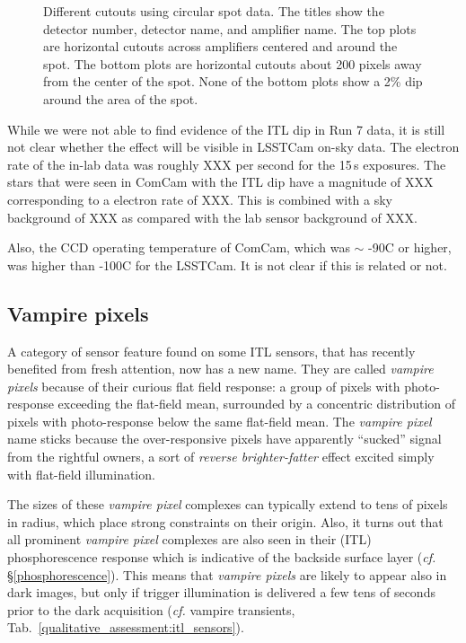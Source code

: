 \begin{figure}[ht]
\caption{Different cutouts using circular spot data. The titles show the detector number, detector name, and amplifier name. The top plots are horizontal cutouts across amplifiers centered and around the spot. The bottom plots are horizontal cutouts about 200 pixels away from the center of the spot. None of the bottom plots show a 2\% dip around the area of the spot.}
\label{fig:ITLDip_Spots}
\end{figure}

While we were not able to find evidence of the ITL dip in Run 7 data, it
is still not clear whether the effect will be visible in LSSTCam on-sky data.
The electron rate of the in-lab data was roughly XXX per second for the 15\,s exposures. The stars that were seen in ComCam with the ITL dip
have a magnitude of XXX corresponding to a electron rate of XXX. This is
combined with a sky background of XXX as compared with the lab sensor
background of XXX.

Also, the CCD operating temperature of ComCam, which was $\sim$ -90C or higher, was higher than -100C for the LSSTCam. It is not clear if this is related or not.

\subsection{Vampire pixels}\label{vampire-pixels}

A category of sensor feature found on some ITL sensors, that has recently benefited from fresh attention, now has a new name. They are called {\it vampire pixels} because of their curious flat field response: a group of pixels with photo-response exceeding the flat-field mean, surrounded by a concentric distribution of pixels with photo-response below the same flat-field mean. The {\it vampire pixel} name sticks because the over-responsive pixels have apparently ``sucked'' signal from the rightful owners, a sort of {\it reverse brighter-fatter} effect excited simply with flat-field illumination. 

The sizes of these {\it vampire pixel} complexes can typically extend to tens of pixels in radius, which place strong constraints on their origin. Also, it turns out that all prominent {\it vampire pixel} complexes are also seen in their (ITL) phosphorescence response which is indicative of the backside surface layer ({\it cf.} \S\ref{phosphorescence}). This means that {\it vampire pixels} are likely to appear also in dark images, but only if trigger illumination is delivered a few tens of seconds prior to the dark acquisition ({\it cf.} vampire transients, Tab.~\ref{qualitative_assessment:itl_sensors}).

